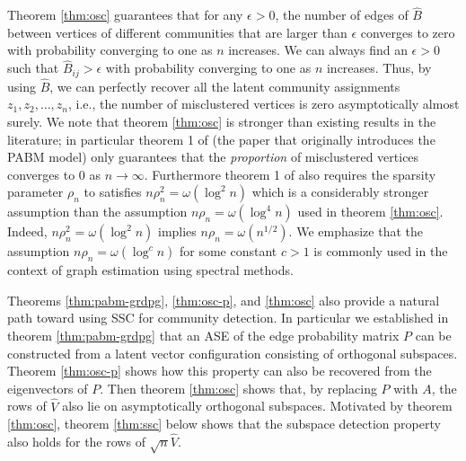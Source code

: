\documentclass[
  12pt,
]{article}
\theoremstyle{definition}
\theoremstyle{definition}
\theoremstyle{definition}
\theoremstyle{definition}
\theoremstyle{remark}
\begin{document}
Theorem \ref{thm:osc} guarantees that for any \(\epsilon > 0\),
the number of edges of \(\hat{B}\) between vertices of different communities that are larger than \(\epsilon\) converges to zero with probability converging to one as \(n\) increases.
We can always find an \(\epsilon > 0\) such that \(\hat{B}_{ij} > \epsilon\) with probability converging to one as \(n\) increases.
Thus, by using \(\hat{B}\), we can perfectly recover all the latent community assignments \(z_1, z_2, \dots, z_n\), i.e., the number of misclustered vertices is zero asymptotically almost surely.
We note that theorem \ref{thm:osc} is stronger than existing results in the literature;
in particular theorem 1 of \citet{307cbeb9b1be48299388437423d94bf1} (the paper that
originally introduces the PABM model) only guarantees that the \emph{proportion} of misclustered vertices converges to \(0\) as \(n \rightarrow \infty\).
Furthermore theorem 1 of \citet{307cbeb9b1be48299388437423d94bf1} also requires the sparsity parameter \(\rho_n\) to satisfies \(n \rho_n^2 = \omega(\log^2{n})\) which is a considerably stronger assumption than the assumption \(n \rho_n =\omega(\log^{4}{n})\) used in theorem \ref{thm:osc}.
Indeed, \(n\rho_n^2 = \omega(\log^{2}{n})\) implies \(n \rho_n = \omega(n^{1/2})\).
We emphasize that the assumption \(n \rho_n = \omega(\log^{c}{n})\) for some constant \(c > 1\) is commonly used in the context of graph estimation using spectral methods.

Theorems \ref{thm:pabm-grdpg}, \ref{thm:osc-p}, and \ref{thm:osc} also provide
a natural path toward using SSC for community detection.
In particular we established in theorem \ref{thm:pabm-grdpg} that an ASE of the edge
probability matrix \(P\) can be constructed from a latent vector configuration
consisting of orthogonal subspaces. Theorem \ref{thm:osc-p} shows how
this property can also be recovered from the eigenvectors of \(P\).
Then theorem \ref{thm:osc} shows that, by replacing \(P\) with \(A\), the
rows of \(\hat{V}\) also lie on asymptotically orthogonal subspaces.
Motivated by theorem \ref{thm:osc}, theorem \ref{thm:ssc} below
shows that the subspace detection property also holds for the rows of
\(\sqrt{n} \hat{V}\).
\end{document}

